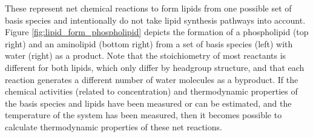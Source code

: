 These represent net chemical reactions to form lipids from one possible set of basis species and intentionally do not take lipid synthesis pathways into account. Figure \ref{fig:lipid_form_phospholipid} depicts the formation of a phospholipid (top right) and an aminolipid (bottom right) from a set of basis species (left) with water (right) as a product. Note that the stoichiometry of most reactants is different for both lipids, which only differ by headgroup structure, and that each reaction generates a different number of water molecules as a byproduct. If the chemical activities (related to concentration) and thermodynamic properties of the basis species and lipids have been measured or can be estimated, and the temperature of the system has been measured, then it becomes possible to calculate thermodynamic properties of these net reactions.


